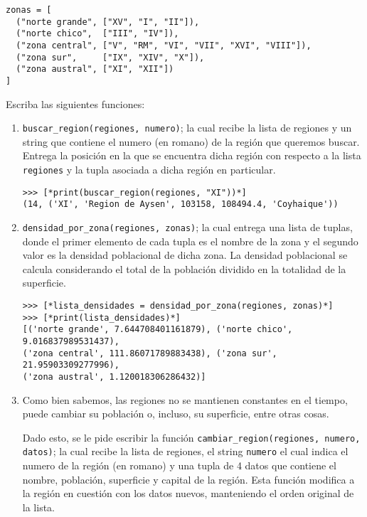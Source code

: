 \begin{lstlisting}[style=consola]
zonas = [
  ("norte grande", ["XV", "I", "II"]),
  ("norte chico",  ["III", "IV"]), 
  ("zona central", ["V", "RM", "VI", "VII", "XVI", "VIII"]),
  ("zona sur",     ["IX", "XIV", "X"]),
  ("zona austral", ["XI", "XII"])
]
\end{lstlisting}

Escriba las siguientes funciones:
\begin{enumerate}
    \item \texttt{buscar\_region(regiones, numero)}; la cual recibe la lista de regiones y un string que contiene el numero (en romano) de la región que queremos buscar. Entrega la posición en la que se encuentra dicha región con respecto a la lista \texttt{regiones} y la tupla asociada a dicha región en particular.
    
\begin{lstlisting}[style=consola]
>>> [*print(buscar_region(regiones, "XI"))*]
(14, ('XI', 'Region de Aysen', 103158, 108494.4, 'Coyhaique'))
\end{lstlisting}

    \item \texttt{densidad\_por\_zona(regiones, zonas)}; la cual entrega una lista de tuplas, donde el primer elemento de cada tupla es el nombre de la zona y el segundo valor es la densidad poblacional de dicha zona. La densidad poblacional se calcula considerando el total de la población dividido en la totalidad de la superficie.
    
\begin{lstlisting}[style=consola]
>>> [*lista_densidades = densidad_por_zona(regiones, zonas)*]
>>> [*print(lista_densidades)*]
[('norte grande', 7.644708401161879), ('norte chico', 9.016837989531437), 
('zona central', 111.86071789883438), ('zona sur', 21.95903309277996), 
('zona austral', 1.120018306286432)]
\end{lstlisting}
    
    \item Como bien sabemos, las regiones no se mantienen constantes en el tiempo, puede cambiar su población o, incluso, su superficie, entre otras cosas. 
    
    Dado esto, se le pide escribir la función \texttt{cambiar\_region(regiones, numero, datos)}; la cual recibe la lista de regiones, el string \texttt{numero} el cual indica el numero de la región (en romano) y una tupla de 4 datos que contiene el nombre, población, superficie y capital de la región. Esta función modifica a la región en cuestión con los datos nuevos, manteniendo el orden original de la lista.
    

\end{enumerate}
